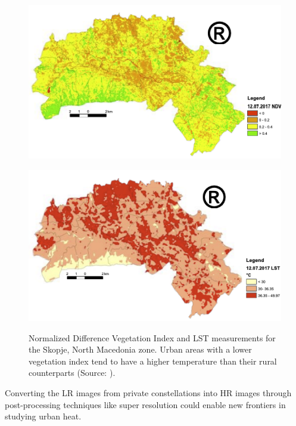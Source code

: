     \begin{figure}[H]
        \centering
        \begin{minipage}{0.75\textwidth}
            \centering
            \includegraphics[width=\textwidth]{Includes/1-skopje-NDVI.png}
            \label{fig:1-skopje-NDVI}
        \end{minipage}\hfill
        \begin{minipage}{0.75\textwidth}
            \centering
            \includegraphics[width=\textwidth]{Includes/1-skopje-LST.png}
            \label{fig:1-skopje-LST}
        \end{minipage}
        \caption{Normalized Difference Vegetation Index \cite{Rouse1973MonitoringVS} and LST measurements for the Skopje, North Macedonia zone. Urban areas with a lower vegetation index tend to have a higher temperature than their rural counterparts (Source: \cite{skopje2018}).} 
        \label{fig:1-skopie-UHI}
    \end{figure}

    Converting the LR images from private constellations into HR images through post-processing techniques like super resolution could enable new frontiers in studying urban heat. 

